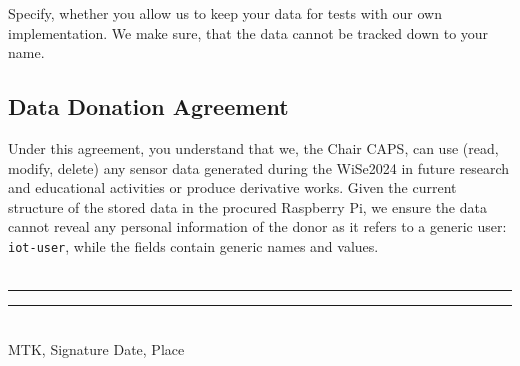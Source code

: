 \documentclass[A4,10pt]{article}
\begin{document}
Specify, whether you allow us to keep your data for tests with our own implementation. We make sure, that the data cannot be tracked down to your name. 

\subsection{Data Donation Agreement}
Under this agreement, you understand that we, the Chair CAPS, can use (read, modify, delete) any sensor data generated during the WiSe2024 in future research and educational activities or produce derivative works. Given the current structure of the stored data in the procured Raspberry Pi, we ensure the data cannot reveal any personal information of the donor as it refers to a generic user: \texttt{iot-user}, while the fields contain generic names and values.
\bigskip
\\
\\

\noindent\rule{5cm}{0.4pt} \hfill \noindent\rule{5cm}{0.4pt}\\
MTK, Signature \hfill Date, Place

\pagebreak

\nocite{robotron,
stonx,vice,650sim,herculessim,zib,4004,thermal1,thermal2,rojas}




\end{document}
